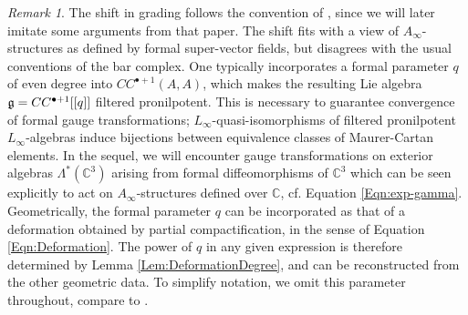 \documentclass[reqno,10pt]{amsart}
\numberwithin{equation}{section}
\newcommand{\bC}{{\mathbb C}}
\theoremstyle{remark}
\newtheorem{Remark}[thm]{Remark}
\begin{document}
\begin{Remark}  \label{Rem:Pronilpotent}
The shift in grading follows the convention of \cite{Seidel:HMSgenus2}, since we will later imitate some arguments from that paper. The shift fits with a view of $A_{\infty}$-structures as defined by formal super-vector fields,  but disagrees with the usual conventions of the bar complex.  One typically incorporates a formal parameter $q$ of even degree into $CC^{\bullet+1}(A,A)$, which makes the resulting Lie algebra $\frak{g} = CC^{\bullet+1}[[q]]$ filtered pronilpotent.  This is necessary to guarantee convergence of formal gauge transformations; $L_{\infty}$-quasi-isomorphisms of filtered pronilpotent $L_{\infty}$-algebras  induce bijections between equivalence classes of Maurer-Cartan elements.  In the sequel, we will encounter gauge transformations on exterior algebras $\Lambda^*(\bC^3)$ arising from formal diffeomorphisms of $\bC^3$ which can be seen explicitly to act on $A_{\infty}$-structures defined over $\bC$, cf. Equation \ref{Eqn:exp-gamma}.  Geometrically, the formal parameter $q$ can be incorporated as that of a deformation obtained by partial compactification, in the sense of Equation \ref{Eqn:Deformation}.  The power of $q$ in any given expression is therefore determined by Lemma \ref{Lem:DeformationDegree}, and can be reconstructed from the other geometric data. To simplify notation, we omit this parameter throughout, compare to \cite[Sections 4,5]{Seidel:HMSgenus2}.
\end{Remark}
 
\end{document}
